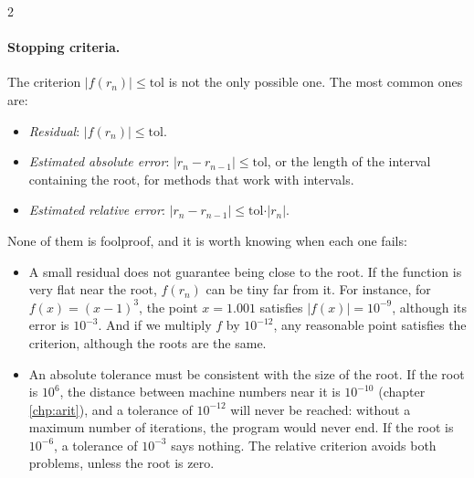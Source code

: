\begin{paracol}{2}
\paragraph*{Stopping criteria.} The criterion $\vert f(r_n)\vert\leq\text{tol}$ is not the only possible one. The most common ones are:
\begin{itemize}
\item \emph{Residual}: $\vert f(r_n)\vert\leq \text{tol}$.
\item \emph{Estimated absolute error}: $\vert r_n-r_{n-1}\vert\leq \text{tol}$, or the length of the interval containing the root, for methods that work with intervals.
\item \emph{Estimated relative error}: $\vert r_n-r_{n-1}\vert\leq \text{tol}\cdot\vert r_n\vert$.
\end{itemize}
None of them is foolproof, and it is worth knowing when each one fails:
\begin{itemize}
\item A small residual does not guarantee being close to the root. If the function is very flat near the root, $f(r_n)$ can be tiny far from it. For instance, for $f(x)=(x-1)^3$, the point $x=1.001$ satisfies $\vert f(x)\vert=10^{-9}$, although its error is $10^{-3}$. And if we multiply $f$ by $10^{-12}$, any reasonable point satisfies the criterion, although the roots are the same.
\item An absolute tolerance must be consistent with the size of the root. If the root is $10^{6}$, the distance between machine numbers near it is $10^{-10}$ (chapter \ref{chp:arit}), and a tolerance of $10^{-12}$ will never be reached: without a maximum number of iterations, the program would never end. If the root is $10^{-6}$, a tolerance of $10^{-3}$ says nothing. The relative criterion avoids both problems, unless the root is zero.
\end{itemize}
\end{paracol}

